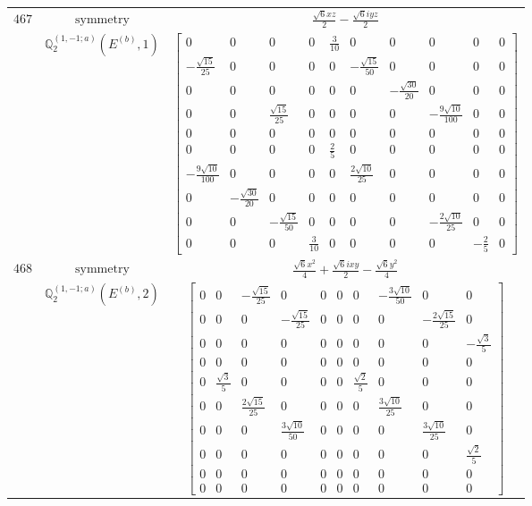 \documentclass[fleqn,8pt,landscape]{jsarticle}
\begin{document}
\begin{longtable}{ccc}
$ 467 $ & $ \text{symmetry} $ & $ \frac{\sqrt{6} x z}{2} - \frac{\sqrt{6} i y z}{2} $ \\
$  $ & $ \mathbb{Q}_{2}^{(1,-1;a)}(E^{(b)},1) $ & $ \begin{bmatrix} 0 & 0 & 0 & 0 & \frac{3}{10} & 0 & 0 & 0 & 0 & 0 \\ - \frac{\sqrt{15}}{25} & 0 & 0 & 0 & 0 & - \frac{\sqrt{15}}{50} & 0 & 0 & 0 & 0 \\ 0 & 0 & 0 & 0 & 0 & 0 & - \frac{\sqrt{30}}{20} & 0 & 0 & 0 \\ 0 & 0 & \frac{\sqrt{15}}{25} & 0 & 0 & 0 & 0 & - \frac{9 \sqrt{10}}{100} & 0 & 0 \\ 0 & 0 & 0 & 0 & 0 & 0 & 0 & 0 & 0 & 0 \\ 0 & 0 & 0 & 0 & \frac{2}{5} & 0 & 0 & 0 & 0 & 0 \\ - \frac{9 \sqrt{10}}{100} & 0 & 0 & 0 & 0 & \frac{2 \sqrt{10}}{25} & 0 & 0 & 0 & 0 \\ 0 & - \frac{\sqrt{30}}{20} & 0 & 0 & 0 & 0 & 0 & 0 & 0 & 0 \\ 0 & 0 & - \frac{\sqrt{15}}{50} & 0 & 0 & 0 & 0 & - \frac{2 \sqrt{10}}{25} & 0 & 0 \\ 0 & 0 & 0 & \frac{3}{10} & 0 & 0 & 0 & 0 & - \frac{2}{5} & 0 \end{bmatrix} $ \\ \hline
$ 468 $ & $ \text{symmetry} $ & $ \frac{\sqrt{6} x^{2}}{4} + \frac{\sqrt{6} i x y}{2} - \frac{\sqrt{6} y^{2}}{4} $ \\
$  $ & $ \mathbb{Q}_{2}^{(1,-1;a)}(E^{(b)},2) $ & $ \begin{bmatrix} 0 & 0 & - \frac{\sqrt{15}}{25} & 0 & 0 & 0 & 0 & - \frac{3 \sqrt{10}}{50} & 0 & 0 \\ 0 & 0 & 0 & - \frac{\sqrt{15}}{25} & 0 & 0 & 0 & 0 & - \frac{2 \sqrt{15}}{25} & 0 \\ 0 & 0 & 0 & 0 & 0 & 0 & 0 & 0 & 0 & - \frac{\sqrt{3}}{5} \\ 0 & 0 & 0 & 0 & 0 & 0 & 0 & 0 & 0 & 0 \\ 0 & \frac{\sqrt{3}}{5} & 0 & 0 & 0 & 0 & \frac{\sqrt{2}}{5} & 0 & 0 & 0 \\ 0 & 0 & \frac{2 \sqrt{15}}{25} & 0 & 0 & 0 & 0 & \frac{3 \sqrt{10}}{25} & 0 & 0 \\ 0 & 0 & 0 & \frac{3 \sqrt{10}}{50} & 0 & 0 & 0 & 0 & \frac{3 \sqrt{10}}{25} & 0 \\ 0 & 0 & 0 & 0 & 0 & 0 & 0 & 0 & 0 & \frac{\sqrt{2}}{5} \\ 0 & 0 & 0 & 0 & 0 & 0 & 0 & 0 & 0 & 0 \\ 0 & 0 & 0 & 0 & 0 & 0 & 0 & 0 & 0 & 0 \end{bmatrix} $ \\ \hline

\end{longtable}
\end{document}
